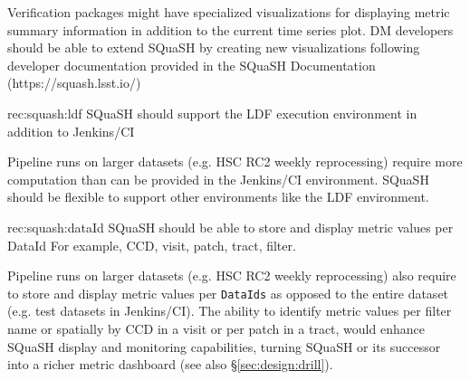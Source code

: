Verification packages might have specialized visualizations for displaying metric summary information in addition to the current time series plot. DM developers should be able to extend SQuaSH by creating new visualizations following developer documentation provided in the SQuaSH Documentation (https://squash.lsst.io/)

\begin{recommendation}
    {rec:squash:ldf}
    {SQuaSH should support the LDF execution environment in addition to Jenkins/CI}
\end{recommendation}

Pipeline runs on larger datasets (e.g. HSC RC2 weekly reprocessing) require more computation than can be provided in the Jenkins/CI environment. SQuaSH should be flexible to support other environments like the LDF environment.

\begin{recommendation}
    {rec:squash:dataId}
    {SQuaSH should be able to store and display metric values per DataId}
For example, CCD, visit, patch, tract, filter.
\end{recommendation}

Pipeline runs on larger datasets (e.g. HSC RC2 weekly reprocessing) also require to store and display metric values per \texttt{DataIds} as opposed to the entire dataset (e.g. test datasets in Jenkins/CI). The ability to identify metric values per filter name or spatially by CCD in a visit or per patch in a tract, would enhance SQuaSH display and monitoring capabilities, turning SQuaSH or its successor into a richer metric dashboard (see also \S\ref{sec:design:drill}).
